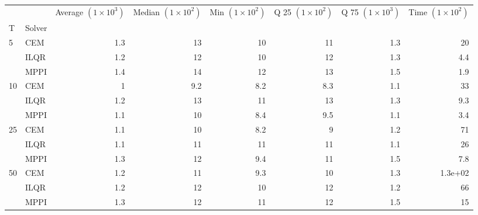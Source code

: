 \documentclass[]{standalone}
\begin{document}
\begin{tabular}{llrrrrrr}
\toprule
   &      &  Average $(1 \times 10^3) $ &  Median $(1 \times 10^2) $ &  Min $(1 \times 10^2) $ &  Q 25 $(1 \times 10^2) $ &  Q 75 $(1 \times 10^3) $ &  Time $(1 \times 10^2) $ \\
T & Solver &                             &                            &                         &                          &                          &                          \\
\midrule
5  & CEM &                         1.3 &                         13 &                      10 &                       11 &                      1.3 &                       20 \\
   & ILQR &                         1.2 &                         12 &                      10 &                       12 &                      1.3 &                      4.4 \\
   & MPPI &                         1.4 &                         14 &                      12 &                       13 &                      1.5 &                      1.9 \\
10 & CEM &                           1 &                        9.2 &                     8.2 &                      8.3 &                      1.1 &                       33 \\
   & ILQR &                         1.2 &                         13 &                      11 &                       13 &                      1.3 &                      9.3 \\
   & MPPI &                         1.1 &                         10 &                     8.4 &                      9.5 &                      1.1 &                      3.4 \\
25 & CEM &                         1.1 &                         10 &                     8.2 &                        9 &                      1.2 &                       71 \\
   & ILQR &                         1.1 &                         11 &                      11 &                       11 &                      1.1 &                       26 \\
   & MPPI &                         1.3 &                         12 &                     9.4 &                       11 &                      1.5 &                      7.8 \\
50 & CEM &                         1.2 &                         11 &                     9.3 &                       10 &                      1.3 &                  1.3e+02 \\
   & ILQR &                         1.2 &                         12 &                      10 &                       12 &                      1.2 &                       66 \\
   & MPPI &                         1.3 &                         12 &                      11 &                       12 &                      1.5 &                       15 \\
\bottomrule
\end{tabular}
\end{document}
